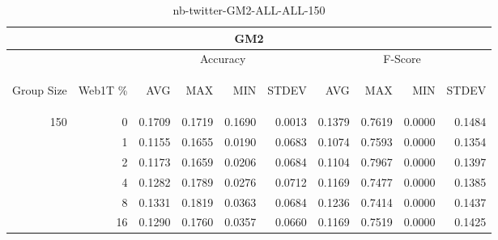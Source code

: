 \begin{center}
\begin{table}[htbp]
\begin{tabular}{ | r | r | r | r | r | r | r | r | r | r |}
\hline
\multicolumn{10}{|c|}{GM2}\\
\hline
 & & \multicolumn{4}{|c|}{Accuracy} & \multicolumn{4}{|c|}{F-Score}\\ \cline{3-10}
\begin{sideways}Group Size\end{sideways} & \begin{sideways}Web1T \%\end{sideways} & \begin{sideways}AVG\end{sideways} & \begin{sideways}MAX\end{sideways} & \begin{sideways}MIN\end{sideways} & \begin{sideways}STDEV\end{sideways} & \begin{sideways}AVG\end{sideways} & \begin{sideways}MAX\end{sideways} & \begin{sideways}MIN\end{sideways} & \begin{sideways}STDEV\end{sideways}\\
\hline
\multirow{5}{*}{150}
 & 0 & 0.1709 & 0.1719 & 0.1690 & 0.0013 & 0.1379 & 0.7619 & 0.0000 & 0.1484\\ \cline{2-10}
 & 1 & 0.1155 & 0.1655 & 0.0190 & 0.0683 & 0.1074 & 0.7593 & 0.0000 & 0.1354\\ \cline{2-10}
 & 2 & 0.1173 & 0.1659 & 0.0206 & 0.0684 & 0.1104 & 0.7967 & 0.0000 & 0.1397\\ \cline{2-10}
 & 4 & 0.1282 & 0.1789 & 0.0276 & 0.0712 & 0.1169 & 0.7477 & 0.0000 & 0.1385\\ \cline{2-10}
 & 8 & 0.1331 & 0.1819 & 0.0363 & 0.0684 & 0.1236 & 0.7414 & 0.0000 & 0.1437\\ \cline{2-10}
 & 16 & 0.1290 & 0.1760 & 0.0357 & 0.0660 & 0.1169 & 0.7519 & 0.0000 & 0.1425\\ \cline{2-10}
\hline
\end{tabular}
\caption{nb-twitter-GM2-ALL-ALL-150}
\label{table:nb-twitter-GM2-ALL-ALL-150}
\end{table}
\end{center}

